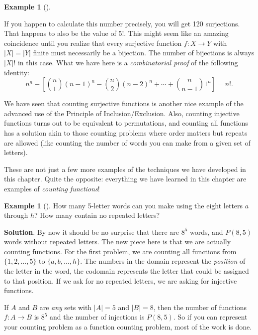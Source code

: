 \documentclass[10pt,]{book}
\theoremstyle{plain}
\theoremstyle{definition}
\theoremstyle{definition}
\newtheorem{example}[theorem]{Example}
\theoremstyle{definition}
\theoremstyle{definition}
\numberwithin{equation}{chapter}
\newcommand{\card}[1]{\left| #1 \right|}
\begin{document}
\begin{example}[]
\begin{enumerate}
\par
\hypertarget{p-905}{}%
If you happen to calculate this number precisely, you will get 120 surjections.  That happens to also be the value of \(5!\).  This might seem like an amazing coincidence until you realize that every surjective function \(f:X \to Y\) with \(\card{X} = \card{Y}\) finite must necessarily be a bijection.  The number of bijections is always \(\card{X}!\) in this case.  What we have here is a \emph{combinatorial proof} of the following identity:%
\begin{equation*}
n^n - \left[{n\choose 1}(n-1)^n - {n \choose 2}(n-2)^n + \cdots + {n \choose n-1}1^n \right] = n!.
\end{equation*}
%
\end{enumerate}
%
\end{example}
\hypertarget{p-906}{}%
We have seen that counting surjective functions is another nice example of the advanced use of the Principle of Inclusion/Exclusion. Also, counting injective functions turns out to be equivalent to permutations, and counting all functions has a solution akin to those counting problems where order matters but repeats are allowed (like counting the number of words you can make from a given set of letters).%
\par
\hypertarget{p-907}{}%
These are not just a few more examples of the techniques we have developed in this chapter. Quite the opposite: everything we have learned in this chapter are examples of \emph{counting functions}!%
\begin{example}[]\label{example-20}
\hypertarget{p-908}{}%
How many 5-letter words can you make using the eight letters \(a\) through \(h\)? How many contain no repeated letters?%
\par\smallskip%
\noindent\textbf{Solution}.\hypertarget{solution-85}{}\quad%
\hypertarget{p-909}{}%
By now it should be no surprise that there are \(8^5\) words, and \(P(8,5)\) words without repeated letters. The new piece here is that we are actually counting functions. For the first problem, we are counting all functions from \(\{1,2,\ldots, 5\}\) to \(\{a,b,\ldots, h\}\). The numbers in the domain represent the \emph{position} of the letter in the word, the codomain represents the letter that could be assigned to that position. If we ask for no repeated letters, we are asking for injective functions.%
\par
\hypertarget{p-910}{}%
If \(A\) and \(B\) are \emph{any} sets with \(|A| = 5\) and \(|B| = 8\), then the number of functions \(f: A \to B\) is \(8^5\) and the number of injections is \(P(8,5)\). So if you can represent your counting problem as a function counting problem, most of the work is done.%
\end{example}
\end{document}
